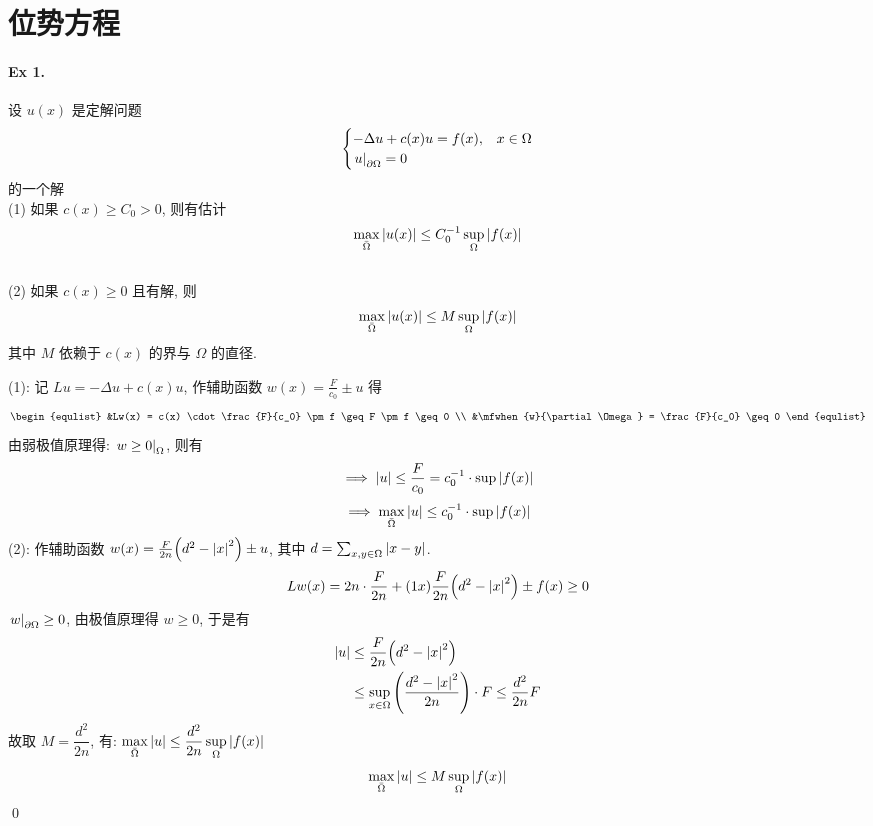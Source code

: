 \section{位势方程}
\paragraph{Ex 1.}
设 $u(x)$ 是定解问题
\[ \begin{cases}
-\Delta u + c(x) u = f(x), & x \in \Omega \\
{\left.{u} \right|}_{\partial \Omega} = 0
\end{cases} \]
的一个解 \\
(1) 如果 $c(x) \geq C_0 > 0$, 则有估计
\[ \max_{\bar\Omega}{\lvert {u(x)} \rvert} \leq C_0^{-1} \sup_{\Omega}{\lvert {f(x)} \rvert} \]\\
(2) 如果 $c(x) \geq 0$ 且有解, 则
\[ \max_{\bar\Omega}{\lvert {u(x)} \rvert} \leq M \sup_{\Omega}{\lvert {f(x)} \rvert} \]
其中 $M$ 依赖于 $c(x)$ 的界与 $\Omega$ 的直径.

\begin{solution}
\noindent (1): 记 $Lu = -\Delta u+c(x)u$, 作辅助函数 $w(x)=\frac F{c_0}\pm u$ 得
\[ \begin{equlist}
&Lw(x) = c(x) \cdot \frac{F}{c_0} \pm f \geq F \pm f \geq 0 \\
&\mfwhen{w}{\partial\Omega} = \frac{F}{c_0} \geq 0
\end{equlist} \]
由弱极值原理得: ${\left.{w\geq0} \right|}_{\Omega}$, 则有
\[\implies {\lvert {u} \rvert} \leq \frac{F}{c_0} = c_0^{-1} \cdot \sup{\lvert {f(x)} \rvert}\]
\[\implies \max_{\bar\Omega}{\lvert {u} \rvert}\leq c_0^{-1} \cdot \sup{\lvert {f(x)} \rvert}\]
\noindent (2): 作辅助函数 $w(x)=\frac F{2n}{\left( {d^2-{\lvert {x} \rvert}^2} \right)}\pm u$, 其中
$d = \sum_{x, y\in\Omega}{\lvert {x-y} \rvert}$.
\[
Lw(x) = 2n \cdot \frac{F}{2n} + (1x)\frac{F}{2n}{\left( {d^2-{\lvert {x} \rvert}^2} \right)} \pm
f(x) \geq 0
\]
${\left.{w} \right|}_{\partial\Omega}\geq0$, 由极值原理得 $w\geq0$, 于是有
\begin{align*}
{\lvert {u} \rvert} &\leq \frac F{2n}{\left( {d^2-{\lvert {x} \rvert}^2} \right)} \\
&\leq\sup_{x\in\Omega} {\left( {\frac{d^2-{\lvert {x} \rvert}^2}{2n}} \right)}\cdot F
    \leq\frac{d^2}{2n}F
\end{align*}
故取 $M = \dfrac{d^2}{2n}$, 有:
$\max\limits_{\bar\Omega}{\lvert {u} \rvert}\leq\dfrac{d^2}{2n}\sup\limits_\Omega{\lvert {f(x)} \rvert}$
\[\max_{\bar\Omega}{\lvert {u} \rvert}\leq M\sup_\Omega{\lvert {f(x)} \rvert}\]
\qed
\end{solution}
